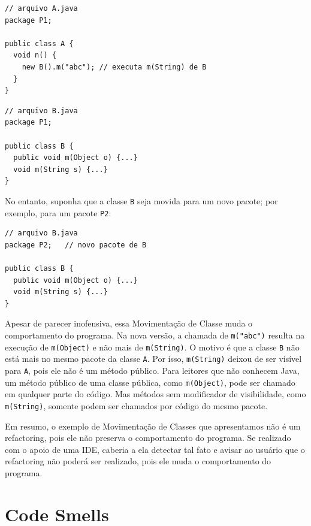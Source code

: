 \documentclass[
  11pt,
  twoside]{book}
\newcommand{\passthrough}[1]{#1}
\begin{document}
\begin{lstlisting}
// arquivo A.java
package P1;

public class A {
  void n() { 
    new B().m("abc"); // executa m(String) de B
  }
}
\end{lstlisting}

\begin{lstlisting}
// arquivo B.java
package P1;

public class B {
  public void m(Object o) {...}
  void m(String s) {...}
}
\end{lstlisting}

No entanto, suponha que a classe \passthrough{\lstinline!B!} seja movida
para um novo pacote; por exemplo, para um pacote
\passthrough{\lstinline!P2!}:

\begin{lstlisting}
// arquivo B.java
package P2;   // novo pacote de B

public class B {
  public void m(Object o) {...}
  void m(String s) {...}
} 
\end{lstlisting}

Apesar de parecer inofensiva, essa Movimentação de Classe muda o
comportamento do programa. Na nova versão, a chamada de
\passthrough{\lstinline!m("abc")!} resulta na execução de
\passthrough{\lstinline!m(Object)!} e não mais de
\passthrough{\lstinline!m(String)!}. O motivo é que a classe
\passthrough{\lstinline!B!} não está mais no mesmo pacote da classe
\passthrough{\lstinline!A!}. Por isso,
\passthrough{\lstinline!m(String)!} deixou de ser visível para
\passthrough{\lstinline!A!}, pois ele não é um método público. Para
leitores que não conhecem Java, um método público de uma classe pública,
como \passthrough{\lstinline!m(Object)!}, pode ser chamado em qualquer
parte do código. Mas métodos sem modificador de visibilidade, como
\passthrough{\lstinline!m(String)!}, somente podem ser chamados por
código do mesmo pacote.

Em resumo, o exemplo de Movimentação de Classes que apresentamos não é
um refactoring, pois ele não preserva o comportamento do programa. Se
realizado com o apoio de uma IDE, caberia a ela detectar tal fato e
avisar ao usuário que o refactoring não poderá ser realizado, pois ele
muda o comportamento do programa.

\hypertarget{code-smells}{%
\section{Code Smells}\label{code-smells}}
\end{document}
